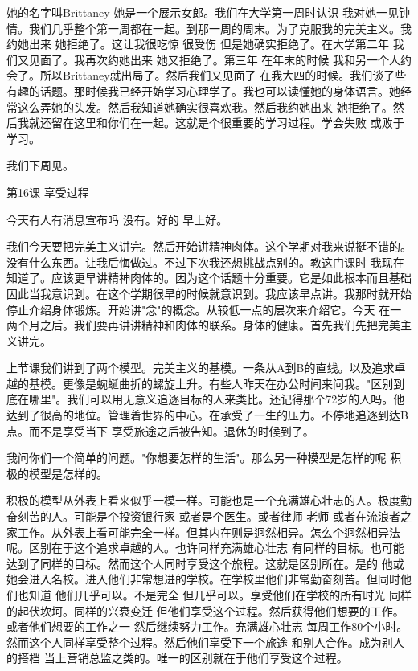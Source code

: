 她的名字叫Brittaney 她是一个展示女郎。我们在大学第一周时认识 我对她一见钟情。我们几乎整个第一周都在一起。到那一周的周末。为了克服我的完美主义。我约她出来 她拒绝了。这让我很吃惊 很受伤 但是她确实拒绝了。在大学第二年 我们又见面了。我再次约她出来 她又拒绝了。第三年 在年末的时候 我和另一个人约会了。所以Brittaney就出局了。然后我们又见面了 在我大四的时候。我们谈了些有趣的话题。那时候我已经开始学习心理学了。我也可以读懂她的身体语言。她经常这么弄她的头发。然后我知道她确实很喜欢我。然后我约她出来 她拒绝了。然后我就还留在这里和你们在一起。这就是个很重要的学习过程。学会失败 或败于学习。 

我们下周见。 

第16课-享受过程 

今天有人有消息宣布吗 没有。好的 早上好。 

我们今天要把完美主义讲完。然后开始讲精神肉体。这个学期对我来说挺不错的。没有什么东西。让我后悔做过。不过下次我还想挑战点别的。教这门课时 我现在知道了。应该更早讲精神肉体的。因为这个话题十分重要。它是如此根本而且基础 因此当我意识到。在这个学期很早的时候就意识到。我应该早点讲。我那时就开始停止介绍身体锻炼。开始讲"念"的概念。从较低一点的层次来介绍它。今天 在一两个月之后。我们要再讲讲精神和肉体的联系。身体的健康。首先我们先把完美主义讲完。 

上节课我们讲到了两个模型。完美主义的基模。一条从A到B的直线。以及追求卓越的基模。更像是蜿蜒曲折的螺旋上升。有些人昨天在办公时间来问我。"区别到底在哪里"。我们可以用无意义追逐目标的人来类比。还记得那个72岁的人吗。他达到了很高的地位。管理着世界的中心。在承受了一生的压力。不停地追逐到达B点。而不是享受当下 享受旅途之后被告知。退休的时候到了。 

我问你们一个简单的问题。"你想要怎样的生活"。那么另一种模型是怎样的呢 积极的模型是怎样的。 

积极的模型从外表上看来似乎一模一样。可能也是一个充满雄心壮志的人。极度勤奋刻苦的人。可能是个投资银行家 或者是个医生。或者律师 老师 或者在流浪者之家工作。从外表上看可能完全一样。但其内在则是迥然相异。怎么个迥然相异法呢。区别在于这个追求卓越的人。也许同样充满雄心壮志 有同样的目标。也可能达到了同样的目标。然而这个人同时享受这个旅程。这就是区别所在。是的 他或她会进入名校。进入他们非常想进的学校。在学校里他们非常勤奋刻苦。但同时他们也知道 他们几乎可以。不是完全 但几乎可以。享受他们在学校的所有时光 同样的起伏坎坷。同样的兴衰变迁 但他们享受这个过程。然后获得他们想要的工作。或者他们想要的工作之一 然后继续努力工作。充满雄心壮志 每周工作80个小时。然而这个人同样享受整个过程。然后他们享受下一个旅途 和别人合作。成为别人的搭档 当上营销总监之类的。唯一的区别就在于他们享受这个过程。 

